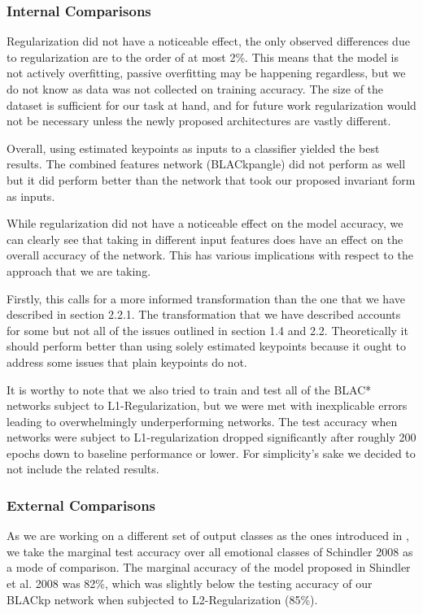 \documentclass{article}
\begin{document}
\subsubsection{Internal Comparisons}

Regularization did not have a noticeable effect, the only observed differences due to regularization are to the order of at most 2\%. This means that the model is not actively overfitting, passive overfitting may be happening regardless, but we do not know as data was not collected on training accuracy. The size of the dataset is sufficient for our task at hand, and for future work regularization would not be necessary unless the newly proposed architectures are vastly different.

Overall, using estimated keypoints as inputs to a classifier yielded the best results. The combined features network (BLACkpangle) did not perform as well but it did perform better than the network that took our proposed invariant form as inputs.

While regularization did not have a noticeable effect on the model accuracy, we can clearly see that taking in different input features does have an effect on the overall accuracy of the network. This has various implications with respect to the approach that we are taking.

Firstly, this calls for a more informed transformation than the one that we have described in section 2.2.1. The transformation that we have described accounts for some but not all of the issues outlined in section 1.4 and 2.2. Theoretically it should perform better than using solely estimated keypoints because it ought to address some issues that plain keypoints do not.

It is worthy to note that we also tried to train and test all of the BLAC* networks subject to L1-Regularization, but we were met with inexplicable errors leading to overwhelmingly underperforming networks. The test accuracy when networks were subject to L1-regularization dropped significantly after roughly 200 epochs down to baseline performance or lower. For simplicity's sake we decided to not include the related results.

\subsubsection{External Comparisons}

As we are working on a different set of output classes as the ones introduced in \citep{schindler2008recognizing}, we take the marginal test accuracy over all emotional classes of Schindler 2008 as a mode of comparison. The marginal accuracy of the model proposed in Shindler et al. 2008 was 82\%, which was slightly below the testing accuracy of our BLACkp network when subjected to L2-Regularization (85\%).
\end{document}
